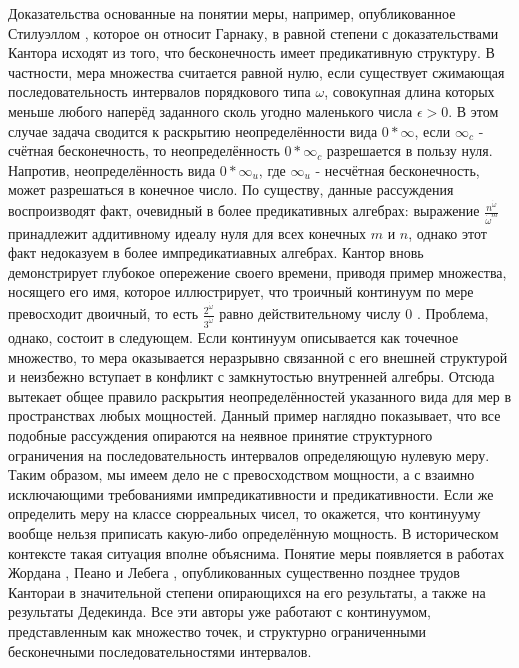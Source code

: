 \documentclass[12pt]{article}
\begin{document}
Доказательства основанные на понятии меры, например, опубликованное Стилуэллом \cite{continuum-measure}, которое он относит Гарнаку, в равной степени с доказательствами Кантора исходят из того, что бесконечность имеет предикативную структуру. В частности, мера множества считается равной нулю, если существует сжимающая последовательность интервалов порядкового типа $\omega$, совокупная длина которых меньше любого наперёд заданного сколь угодно маленького числа $\epsilon > 0$. В этом случае задача сводится к раскрытию неопределённости вида $0*\infty$, если $\infty_c$ - счётная бесконечность, то неопределённость $0*\infty_c$ разрешается в пользу нуля. Напротив, неопределённость вида $0*\infty_u$, где $\infty_u$ - несчётная бесконечность, может разрешаться в конечное число. По существу, данные рассуждения воспроизводят факт, очевидный в более предикативных алгебрах: выражение $\frac{n^{\dot{\omega}}}{\dot{\omega}^m}$ принадлежит аддитивному идеалу нуля для всех конечных $m$ и $n$, однако этот факт недоказуем в более импредикатиавных алгебрах. Кантор вновь демонстрирует глубокое опережение своего времени, приводя пример множества, носящего его имя, которое иллюстрирует, что троичный континуум по мере превосходит двоичный, то есть $\frac{2^{\dot{\omega}}}{3^{\dot{\omega}}}$ равно действительному числу 0 \cite{cantor-cantorset}. Проблема, однако, состоит в следующем. Если континуум описывается как точечное множество, то мера оказывается неразрывно связанной с его внешней структурой и неизбежно вступает в конфликт с замкнутостью внутренней алгебры. Отсюда вытекает общее правило раскрытия неопределённостей указанного вида для мер в пространствах любых мощностей. Данный пример наглядно показывает, что все подобные рассуждения опираются на неявное принятие структурного ограничения на последовательность интервалов определяющую нулевую меру. Таким образом, мы имеем дело не с превосходством мощности, а с взаимно исключающими требованиями импредикативности и предикативности. Если же определить меру на классе сюрреальных чисел, то окажется, что континууму вообще нельзя приписать какую-либо определённую мощность. В историческом контексте такая ситуация вполне объяснима. Понятие меры появляется в работах Жордана \cite{jordan}, Пеано \cite{peano} и Лебега \cite{lebesgue}, опубликованных существенно позднее трудов Кантораи в значительной степени опирающихся на его результаты, а также на результаты Дедекинда. Все эти авторы уже работают с континуумом, представленным как множество точек, и структурно ограниченными бесконечными последовательностями интервалов.
\end{document}

